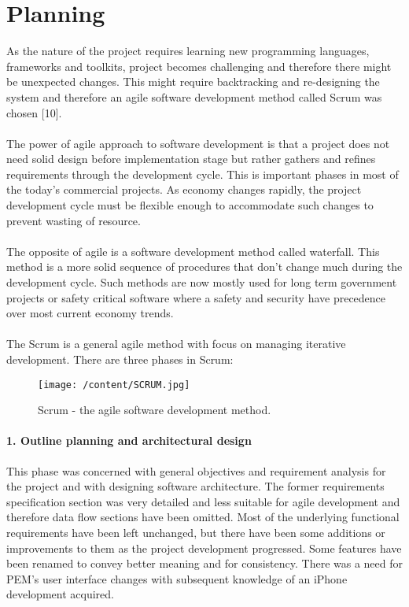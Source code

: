 \documentclass[12pt, a4paper]{report}   %
\begin{document}
\chapter{Planning}
As the nature of the project requires learning new programming languages, frameworks and toolkits, project becomes challenging and therefore there might be unexpected changes. This might require backtracking and re-designing the system and therefore an agile software development method called Scrum was chosen [10].\\ \\
The power of agile approach to software development is that a project does not need solid design before implementation stage but rather gathers and refines requirements through the development cycle. This is important phases in most of the today’s commercial projects. As economy changes rapidly, the project development cycle must be flexible enough to accommodate such changes to prevent wasting of resource.\\ \\
The opposite of agile is a software development method called waterfall. This method is a more solid sequence of procedures that don’t change much during the development cycle. Such methods are now mostly used for long term government projects or safety critical software where a safety and security have precedence over most current economy trends.\\ \\

The Scrum is a general agile method with focus on managing iterative development. There are three phases in Scrum:\\


\begin{figure}[H]
  \centering
	\texttt{[image: /content/SCRUM.jpg]}\\
	  \caption{Scrum - the agile software development method.}
\end{figure}


\subsubsection{1. Outline planning and architectural design}
This phase was concerned with general objectives and requirement analysis for the project and with designing software architecture. The former requirements specification section was very detailed and less suitable for agile development and therefore data flow sections have been omitted. Most of the underlying functional requirements have been left unchanged, but there have been some additions or improvements to them as the project development progressed. Some features have been renamed to convey better meaning and for consistency. There was a need for PEM's user interface changes with subsequent knowledge of an iPhone development acquired.
\end{document}
